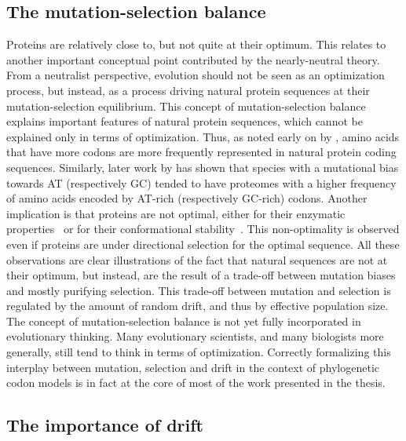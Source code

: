 \subsection{The mutation-selection balance}
\label{subsec:the-mutation-selection-balance}

Proteins are relatively close to, but not quite at their optimum.
This relates to another important conceptual point contributed by the nearly-neutral theory.
From a neutralist perspective, evolution should not be seen as an optimization process, but instead, as a process driving natural protein sequences at their mutation-selection equilibrium.
This concept of mutation-selection balance explains important features of natural protein sequences, which cannot be explained only in terms of optimization.
Thus, as noted early on by \citet{King1969}, amino acids that have more codons are more frequently represented in natural protein coding sequences.
Similarly, later work by \citet{Singer2000} has shown that species with a mutational bias towards AT (respectively GC) tended to have proteomes with a higher frequency of amino acids encoded by AT-rich (respectively GC-rich) codons.
Another implication is that proteins are not optimal, either for their enzymatic properties~\citep{Cornish-Bowden1976,Albery1976,Hartl1985} or for their conformational stability~\citep{Taverna2002}.
This non-optimality is observed even if proteins are under directional selection for the optimal sequence.
All these observations are clear illustrations of the fact that natural sequences are not at their optimum, but instead, are the result of a trade-off between mutation biases and mostly purifying selection.
This trade-off between mutation and selection is regulated by the amount of random drift, and thus by effective population size.
The concept of mutation-selection balance is not yet fully incorporated in evolutionary thinking.
Many evolutionary scientists, and many biologists more generally, still tend to think in terms of optimization.
Correctly formalizing this interplay between mutation, selection and drift in the context of phylogenetic codon models is in fact at the core of most of the work presented in the thesis.

\subsection{The importance of drift}
\label{subsec:importance-of-drift}

